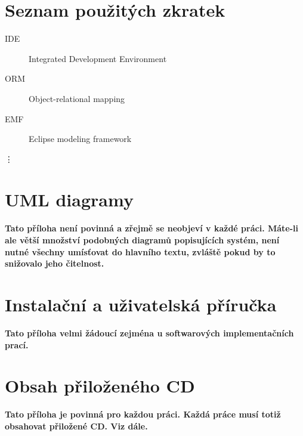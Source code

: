 \documentclass[11pt,twoside,a4paper]{book}
\begin{document}

\chapter{Seznam použitých zkratek}

\begin{description}
\item[IDE] Integrated Development Environment
\item[ORM] Object-relational mapping
\item[EMF] Eclipse modeling framework
\end{description}
\vdots

\chapter{UML diagramy}
\textbf{\large Tato příloha není povinná a zřejmě se neobjeví v každé práci. Máte-li ale větší množství podobných diagramů popisujících systém, není nutné všechny umísťovat do hlavního textu, zvláště pokud by to snižovalo jeho čitelnost.}

\chapter{Instalační a uživatelská příručka}
\textbf{\large Tato příloha velmi žádoucí zejména u softwarových implementačních prací.}

\chapter{Obsah přiloženého CD}
\textbf{\large Tato příloha je povinná pro každou práci. Každá práce musí totiž obsahovat přiložené CD. Viz dále.}
\end{document}
